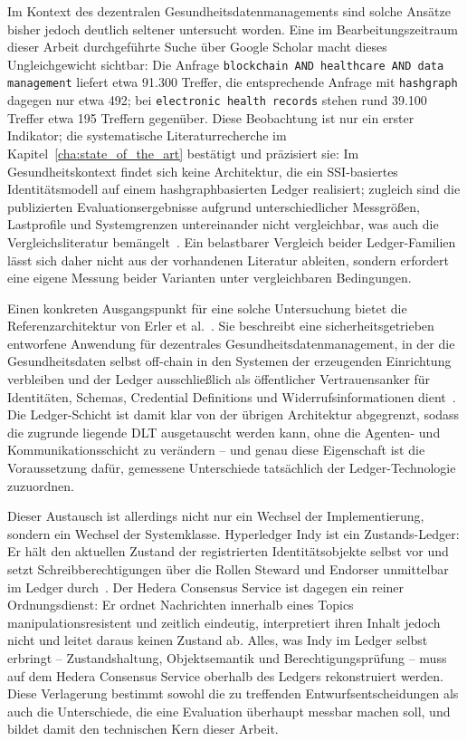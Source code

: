 Im Kontext des dezentralen Gesundheitsdatenmanagements sind solche Ansätze bisher jedoch deutlich seltener untersucht worden. Eine im Bearbeitungszeitraum dieser Arbeit durchgeführte Suche über Google Scholar macht dieses Ungleichgewicht sichtbar: Die Anfrage \texttt{\textquotedbl blockchain\textquotedbl\ AND \textquotedbl healthcare\textquotedbl\ AND \textquotedbl data management\textquotedbl} liefert etwa 91.300 Treffer, die entsprechende Anfrage mit \texttt{\textquotedbl hashgraph\textquotedbl} dagegen nur etwa 492; bei \texttt{\textquotedbl electronic health records\textquotedbl} stehen rund 39.100 Treffer etwa 195 Treffern gegenüber. Diese Beobachtung ist nur ein erster Indikator; die systematische Literaturrecherche im Kapitel~\ref{cha:state_of_the_art} bestätigt und präzisiert sie: Im Gesundheitskontext findet sich keine Architektur, die ein SSI-basiertes Identitätsmodell auf einem hashgraphbasierten Ledger realisiert; zugleich sind die publizierten Evaluationsergebnisse aufgrund unterschiedlicher Messgrößen, Lastprofile und Systemgrenzen untereinander nicht vergleichbar, was auch die Vergleichsliteratur bemängelt~\cite{sehimibendaoud2023, ferreira2024}. Ein belastbarer Vergleich beider Ledger-Familien lässt sich daher nicht aus der vorhandenen Literatur ableiten, sondern erfordert eine eigene Messung beider Varianten unter vergleichbaren Bedingungen.

Einen konkreten Ausgangspunkt für eine solche Untersuchung bietet die Referenzarchitektur von Erler et al.~\cite{erler2023}. Sie beschreibt eine sicherheitsgetrieben entworfene Anwendung für dezentrales Gesundheitsdatenmanagement, in der die Gesundheitsdaten selbst off-chain in den Systemen der erzeugenden Einrichtung verbleiben und der Ledger ausschließlich als öffentlicher Vertrauensanker für Identitäten, Schemas, Credential Definitions und Widerrufsinformationen dient~\cite{erler2023, erler2024}. Die Ledger-Schicht ist damit klar von der übrigen Architektur abgegrenzt, sodass die zugrunde liegende DLT ausgetauscht werden kann, ohne die Agenten- und Kommunikationsschicht zu verändern -- und genau diese Eigenschaft ist die Voraussetzung dafür, gemessene Unterschiede tatsächlich der Ledger-Technologie zuzuordnen.

Dieser Austausch ist allerdings nicht nur ein Wechsel der Implementierung, sondern ein Wechsel der Systemklasse. Hyperledger Indy ist ein Zustands-Ledger: Er hält den aktuellen Zustand der registrierten Identitätsobjekte selbst vor und setzt Schreibberechtigungen über die Rollen Steward und Endorser unmittelbar im Ledger durch~\cite{torongo2023}. Der Hedera Consensus Service ist dagegen ein reiner Ordnungsdienst: Er ordnet Nachrichten innerhalb eines Topics manipulationsresistent und zeitlich eindeutig, interpretiert ihren Inhalt jedoch nicht und leitet daraus keinen Zustand ab. Alles, was Indy im Ledger selbst erbringt -- Zustandshaltung, Objektsemantik und Berechtigungsprüfung -- muss auf dem Hedera Consensus Service oberhalb des Ledgers rekonstruiert werden. Diese Verlagerung bestimmt sowohl die zu treffenden Entwurfsentscheidungen als auch die Unterschiede, die eine Evaluation überhaupt messbar machen soll, und bildet damit den technischen Kern dieser Arbeit.

